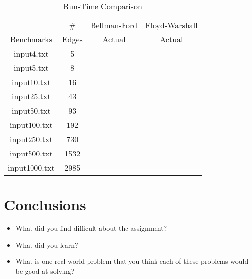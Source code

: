 \documentclass[twocolumn]{article}
\begin{document}
\begin{table}
    \caption{Run-Time Comparison}
    \begin{tabular}{|c|c|c|c|}
        \hline
        &\#&Bellman-Ford&Floyd-Warshall\\
        Benchmarks &Edges&Actual&Actual\\
        \hline
        input4.txt   &   5&      &      \\
        input5.txt   &   8&      &      \\
        input10.txt  &  16&      &      \\
        input25.txt  &  43&      &      \\
        input50.txt  &  93&      &      \\
        input100.txt & 192&      &      \\
        input250.txt & 730&      &      \\
        input500.txt &1532&      &      \\
        input1000.txt&2985&      &      \\
        \hline
    \end{tabular}
    \label{table::run-time}
\end{table}

\section{Conclusions}
\begin{itemize}
    \item What did you find difficult about the assignment?
    \item What did you learn?
    \item What is one real-world problem that you think each of these problems
    would be good at solving?
\end{itemize}
\end{document}
